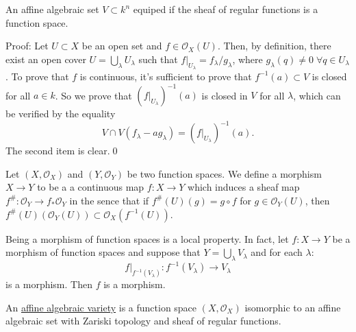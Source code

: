 \begin{dang}
\begin{lemma}
    An affine algebraic set $V\subset k^n$ equiped if the sheaf of regular functions is a function space.
\end{lemma}
\end{dang}
Proof: Let $U\subset X$ be an open set and $f\in\mathcal{O}_X(U)$. Then, by definition, there exist an open cover 
$U=\bigcup_\lambda U_\lambda$ such that $f|_{U_\lambda}=f_\lambda/g_\lambda$, where $g_\lambda(q)\neq0\;\forall q\in U_\lambda$. 
To prove that $f$ is continuous, it's sufficient to prove that $f^{-1}(a)\subset V$ is closed for all $a\in k$. 
So we prove that $(f|_{U_\lambda})^{-1}(a)$ is closed in $V$ for all $\lambda$, which can be verified by the 
equality
\begin{equation}
    V\cap V(f_\lambda - ag_\lambda) = (f|_{U_\lambda})^{-1}(a).
\end{equation}
The second item is clear.\qed 

\begin{dang}
    \begin{definition}
        Let $(X,\mathcal{O}_X)$ and $(Y,\mathcal{O}_Y)$ be two function spaces. We define a morphism $X\to Y$ to be a 
        a continuous map $f:X\to Y$ which induces a sheaf map $f^\#:\mathcal{O}_Y\to f_*\mathcal{O}_Y$ in the sence that 
        if $f^\#(U)(g)=g\circ f$ for $g\in\mathcal{O}_Y(U)$, then $f^\#(U)(\mathcal{O}_Y(U))\subset \mathcal{O}_X(f^{-1}(U))$.
    \end{definition}
\end{dang}

\begin{remark}
    Being a morphism of function spaces is a local property. In fact, let $f:X\to Y$ be a morphism of function spaces and 
    suppose that $Y=\bigcup_\lambda V_\lambda$ and for each $\lambda$:
    \begin{equation}
        f|_{f^{-1}(V_\lambda)}:f^{-1}(V_\lambda)\to V_\lambda
    \end{equation}
    is a morphism. Then $f$ is a morphism.
\end{remark}

\begin{dang}
    \begin{definition}
        An \underline{affine algebraic variety} is a function space $(X,\mathcal{O}_X)$ isomorphic to 
        an affine algebraic set with Zariski topology and sheaf of regular functions.
    \end{definition}
\end{dang}


